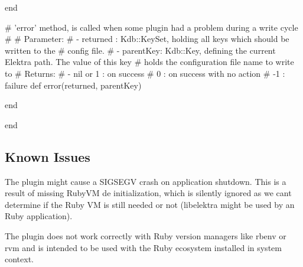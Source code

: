 \begin{DoxyCode}
  end


  # 'error' method, is called when some plugin had a problem during a write cycle
  #
  # Parameter:
  #  - returned : Kdb::KeySet, holding all keys which should be written to the
  #               config file.
  #  - parentKey: Kdb::Key, defining the current Elektra path. The value of this key
  #               holds the configuration file name to write to
  # Returns:
  #  - nil or 1 : on success
  #           0 : on success with no action
  #          -1 : failure
  def error(returned, parentKey)

  end

end
\end{DoxyCode}


\subsection*{Known Issues}


\begin{DoxyItemize}
\item The plugin might cause a S\+I\+G\+S\+E\+GV crash on application shutdown. This is a result of missing Ruby\+VM de initialization, which is silently ignored as we can\textquotesingle{}t determine if the Ruby VM is still needed or not (libelektra might be used by an Ruby application).
\item The plugin does not work correctly with Ruby version managers like {\ttfamily rbenv} or {\ttfamily rvm} and is intended to be used with the Ruby ecosystem installed in system context. 
\end{DoxyItemize}
